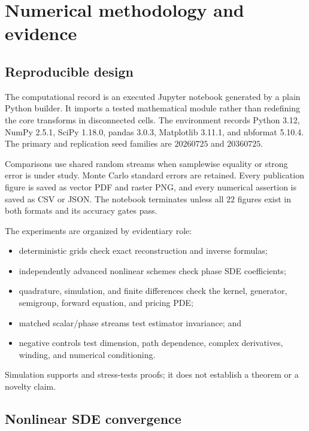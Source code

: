 \documentclass[
  english,
  10pt,
  letterpaper,
  DIV=11,
  numbers=noendperiod]{scrartcl}
\providecommand{\tightlist}{%
  \setlength{\itemsep}{0pt}\setlength{\parskip}{0pt}}
\theoremstyle{definition}
\theoremstyle{plain}
\theoremstyle{plain}
\theoremstyle{remark}
\begin{document}
\section{Numerical methodology and evidence}\label{sec-numerics}

\subsection{Reproducible design}\label{reproducible-design}

The computational record is an executed Jupyter notebook generated by a
plain Python builder. It imports a tested mathematical module rather
than redefining the core transforms in disconnected cells. The
environment records Python 3.12, NumPy 2.5.1, SciPy 1.18.0, pandas
3.0.3, Matplotlib 3.11.1, and nbformat 5.10.4. The primary and
replication seed families are \(20260725\) and \(20360725\).

Comparisons use shared random streams when samplewise equality or strong
error is under study. Monte Carlo standard errors are retained. Every
publication figure is saved as vector PDF and raster PNG, and every
numerical assertion is saved as CSV or JSON. The notebook terminates
unless all \(22\) figures exist in both formats and its accuracy gates
pass.

The experiments are organized by evidentiary role:

\begin{itemize}
\tightlist
\item
  deterministic grids check exact reconstruction and inverse formulas;
\item
  independently advanced nonlinear schemes check phase SDE coefficients;
\item
  quadrature, simulation, and finite differences check the kernel,
  generator, semigroup, forward equation, and pricing PDE;
\item
  matched scalar/phase streams test estimator invariance; and
\item
  negative controls test dimension, path dependence, complex
  derivatives, winding, and numerical conditioning.
\end{itemize}

Simulation supports and stress-tests proofs; it does not establish a
theorem or a novelty claim.

\subsection{Nonlinear SDE convergence}\label{nonlinear-sde-convergence}
\end{document}
